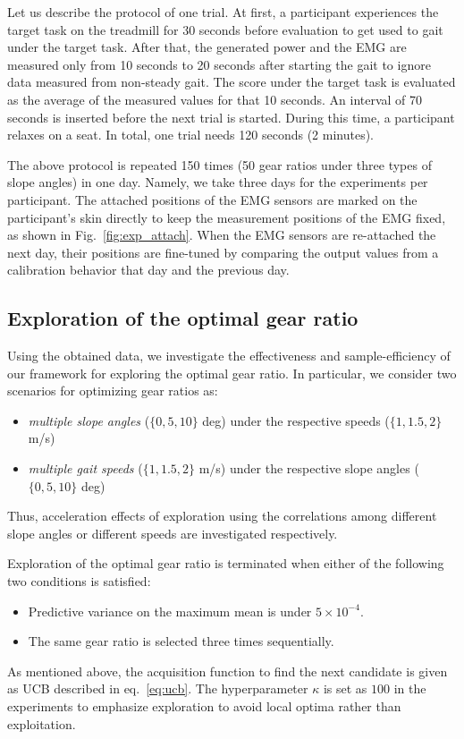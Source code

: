 \documentclass[twocolumn]{svjour3}          %
\begin{document}
Let us describe the protocol of one trial.
At first, a participant experiences the target task on the treadmill for 30 seconds before evaluation to get used to gait under the target task.
After that, the generated power and the EMG are measured only from 10 seconds to 20 seconds after starting the gait to ignore data measured from non-steady gait.
The score under the target task is evaluated as the average of the measured values for that 10 seconds.
An interval of 70 seconds is inserted before the next trial is started.
During this time, a participant relaxes on a seat.
In total, one trial needs 120 seconds (2 minutes).

The above protocol is repeated 150 times (50 gear ratios under three types of slope angles) in one day.
Namely, we take three days for the experiments per participant.
The attached positions of the EMG sensors are marked on the participant's skin directly to keep the measurement positions of the EMG fixed, as shown in Fig.~\ref{fig:exp_attach}.
When the EMG sensors are re-attached the next day, their positions are fine-tuned by comparing the output values from a calibration behavior that day and the previous day.

\subsection{Exploration of the optimal gear ratio}

Using the obtained data, we investigate the effectiveness and sample-efficiency of our framework for exploring the optimal gear ratio.
In particular, we consider two scenarios for optimizing gear ratios as:
\begin{itemize}
    \item \textit{multiple slope angles} ($\{0, 5, 10\}$ deg) under the respective speeds ($\{1, 1.5, 2\}$ m/s)
    \item \textit{multiple gait speeds} ($\{1, 1.5, 2\}$ m/s) under the respective slope angles ($\{0, 5, 10\}$ deg)
\end{itemize}
Thus, acceleration effects of exploration using the correlations among different slope angles or different speeds are investigated respectively.

Exploration of the optimal gear ratio is terminated when either of the following two conditions is satisfied:
\begin{itemize}
    \item Predictive variance on the maximum mean is under $5 \times 10^{-4}$.
    \item The same gear ratio is selected three times sequentially.
\end{itemize}
As mentioned above, the acquisition function to find the next candidate is given as UCB described in eq.~\eqref{eq:ucb}.
The hyperparameter $\kappa$ is set as $100$ in the experiments to emphasize exploration to avoid local optima rather than exploitation.
\end{document}
